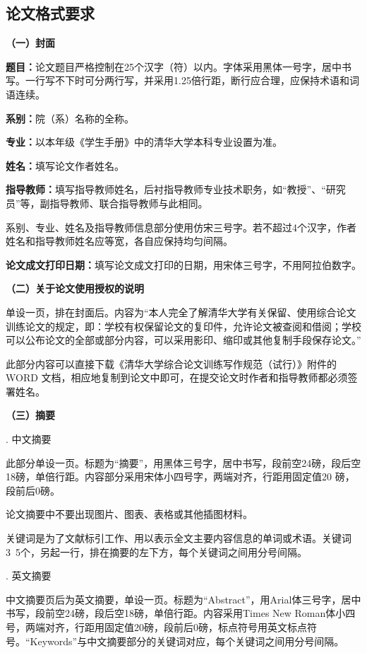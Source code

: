 \documentclass{Diploma}
\begin{document}
\begin{}
\section{论文格式要求}

\noindent\textbf{（一）封面}

\textbf{题目：}论文题目严格控制在25个汉字（符）以内。字体采用黑体一号字，居中书写。一行写不下时可分两行写，并采用1.25倍行距，断行应合理，应保持术语和词语连续。

\textbf{系别：}院（系）名称的全称。

\textbf{专业：}以本年级《学生手册》中的清华大学本科专业设置为准。

\textbf{姓名：}填写论文作者姓名。

\textbf{指导教师：}填写指导教师姓名，后衬指导教师专业技术职务，如“教授”、“研究员”等，副指导教师、联合指导教师与此相同。

系别、专业、姓名及指导教师信息部分使用仿宋三号字。若不超过4个汉字，作者姓名和指导教师姓名应等宽，各自应保持均匀间隔。

\textbf{论文成文打印日期：}填写论文成文打印的日期，用宋体三号字，不用阿拉伯数字。

\noindent\textbf{（二）关于论文使用授权的说明}

单设一页，排在封面后。内容为“本人完全了解清华大学有关保留、使用综合论文训练论文的规定，即：学校有权保留论文的复印件，允许论文被查阅和借阅；学校可以公布论文的全部或部分内容，可以采用影印、缩印或其他复制手段保存论文。”

此部分内容可以直接下载《清华大学综合论文训练写作规范（试行）》附件的WORD 文档，相应地复制到论文中即可，在提交论文时作者和指导教师都必须签署姓名。

\noindent\textbf{（三）摘要}

. 中文摘要

此部分单设一页。标题为“摘要”，用黑体三号字，居中书写，段前空24磅，段后空18磅，单倍行距。内容部分采用宋体小四号字，两端对齐，行距用固定值20 磅，段前后0磅。

论文摘要中不要出现图片、图表、表格或其他插图材料。

关键词是为了文献标引工作、用以表示全文主要内容信息的单词或术语。关键词3~5个，另起一行，排在摘要的左下方，每个关键词之间用分号间隔。

. 英文摘要

中文摘要页后为英文摘要，单设一页。标题为“Abstract”，用Arial体三号字，居中书写，段前空24磅，段后空18磅，单倍行距。内容采用Times New Roman体小四号，两端对齐，行距用固定值20磅，段前后0磅，标点符号用英文标点符号。“Keywords”与中文摘要部分的关键词对应，每个关键词之间用分号间隔。


\end{}
\end{document}
